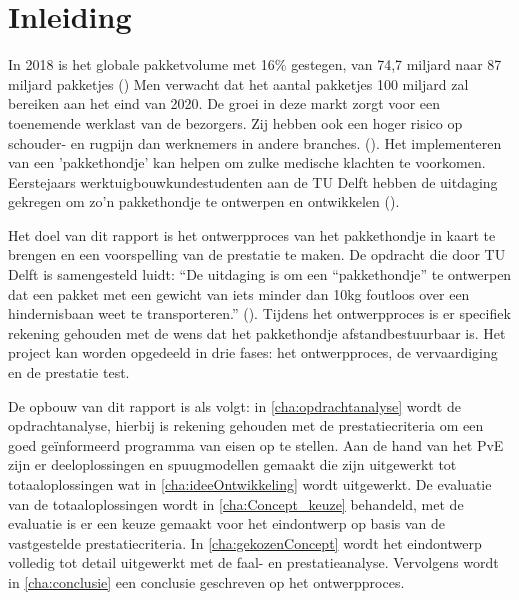 \chapter{Inleiding}
\label{cha:inleiding}
In 2018 is het globale pakketvolume met 16\% gestegen, van 74,7 miljard naar 87 miljard pakketjes (\cite{pitney_bowes_2018}) Men verwacht dat het aantal pakketjes 100 miljard zal bereiken aan het eind van 2020. De groei in deze markt zorgt voor een toenemende werklast van de bezorgers. Zij hebben ook een hoger risico op schouder- en rugpijn dan werknemers in andere branches. (\cite{hurley_marshall_hogan_wells_2012}). Het implementeren van een 'pakkethondje' kan helpen om zulke medische klachten te voorkomen. Eerstejaars werktuigbouwkundestudenten aan de TU Delft hebben de uitdaging gekregen om zo'n pakkethondje te ontwerpen en ontwikkelen (\cite{beek_2020_opdracht}).\\
\vspace{\baselineskip}

Het doel van dit rapport is het ontwerpproces van het pakkethondje in kaart te brengen en een voorspelling van de prestatie te maken. De opdracht die door TU Delft is samengesteld luidt: “De uitdaging is om een “pakkethondje” te ontwerpen dat een pakket met een gewicht van iets minder dan 10kg foutloos over een hindernisbaan weet te transporteren.” (\cite{beek_2020_opdracht}). Tijdens het ontwerpproces is er specifiek rekening gehouden met de wens dat het pakkethondje afstandbestuurbaar is. Het project kan worden opgedeeld in drie fases: het ontwerpproces, de vervaardiging en de prestatie test.\\
\vspace{\baselineskip}

De opbouw van dit rapport is als volgt: in \cref{cha:opdrachtanalyse} wordt de opdrachtanalyse, hierbij is rekening gehouden met de prestatiecriteria om een goed geïnformeerd programma van eisen op te stellen. Aan de hand van het PvE zijn er deeloplossingen en spuugmodellen gemaakt die zijn uitgewerkt tot totaaloplossingen wat in \cref{cha:ideeOntwikkeling} wordt uitgewerkt. De evaluatie van de totaaloplossingen wordt in \cref{cha:Concept_keuze} behandeld, met de evaluatie is er een keuze gemaakt voor het eindontwerp op basis van de vastgestelde prestatiecriteria. In \cref{cha:gekozenConcept} wordt het eindontwerp volledig tot detail uitgewerkt met de faal- en prestatieanalyse. Vervolgens wordt in \cref{cha:conclusie} een conclusie geschreven op het ontwerpproces. \\
